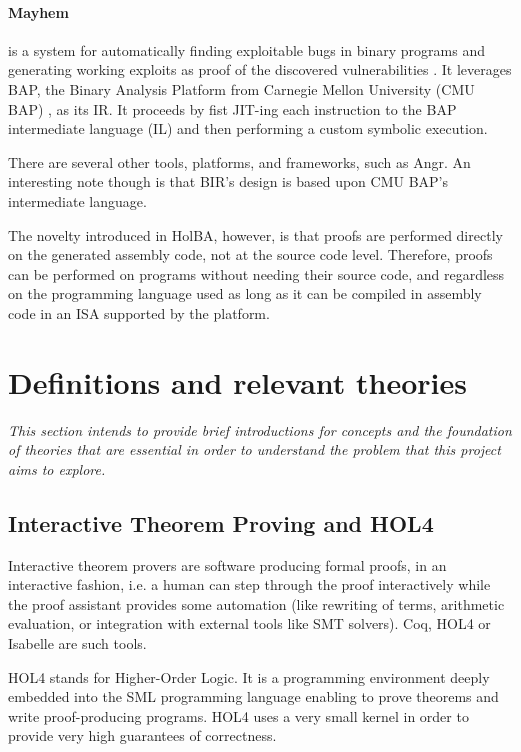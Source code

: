 \documentclass[10pt,a4paper]{article}
\begin{document}
\begin{multicols}{2}
\paragraph{Mayhem} is a system for automatically finding exploitable bugs in binary programs and generating working exploits as proof of the discovered vulnerabilities \cite{cha_unleashing_2012}. It leverages BAP, the Binary Analysis Platform from Carnegie Mellon University (CMU BAP) \cite{brumley_bap:_2011}, as its IR. It proceeds by fist JIT-ing each instruction to the BAP intermediate language (IL) and then performing a custom symbolic execution.
\medskip

There are several other tools, platforms, and frameworks, such as Angr. An interesting note though is that BIR's design is based upon CMU BAP's intermediate language.

The novelty introduced in HolBA, however, is that proofs are performed directly on the generated assembly code, not at the source code level. Therefore, proofs can be performed on programs without needing their source code, and regardless on the programming language used as long as it can be compiled in assembly code in an {ISA} supported by the platform.

\section{Definitions and relevant theories}
\textit{This section intends to provide brief introductions for concepts and the foundation of theories that are essential in order to understand the problem that this project aims to explore.}

\subsection{Interactive Theorem Proving and HOL4} \label{hol4-presentation}

Interactive theorem provers are software producing formal proofs, in an
interactive fashion, i.e. a human can step through the proof interactively while the proof assistant provides some automation (like rewriting of terms, arithmetic evaluation, or integration with external tools like SMT solvers). Coq, HOL4 or Isabelle are such tools.

HOL4 \cite{noauthor_hol_nodate} stands for Higher-Order Logic. It is a programming environment deeply embedded into the {SML} programming language enabling to prove theorems and write {proof-producing} programs. HOL4 uses a very small kernel in order to provide very high guarantees of correctness.



\end{multicols}
\end{document}
